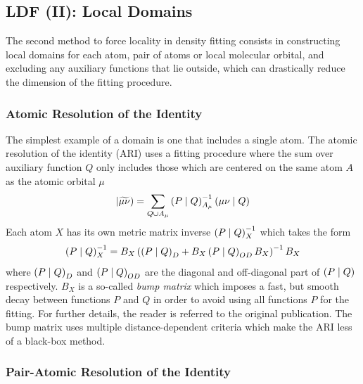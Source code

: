 
\subsection{LDF (II): Local Domains}

The second method to force locality in density fitting consists in constructing local domains for each atom, pair of atoms or local molecular orbital, and excluding any auxiliary functions that lie outside, which can drastically reduce the dimension of the fitting procedure. 

\subsubsection{Atomic Resolution of the Identity}

The simplest example of a domain is one that includes a single atom. The atomic resolution of the identity (ARI) \cite{Sod2008} uses a fitting procedure where the sum over auxiliary function $Q$ only includes those which are centered on the same atom $A$ as the atomic orbital $\mu$
\begin{equation}
\left\lvert \widetilde{\mu\nu} \right) = \sum_{Q \cup A_{\mu}} \left( P \mid Q \right)_{A_{\mu}}^{-1} \left( \mu\nu \mid Q \right)
\end{equation}
\noindent Each atom $X$ has its own metric matrix inverse $\left( P \mid Q \right)_X^{-1}$ which takes the form 
\begin{equation}
\left( P \mid Q \right)_X^{-1} = B_X \left( \left( P \mid Q \right)_D + B_X \left( P \mid Q \right)_{OD}B_X\right)^{-1}B_X
\end{equation}
\noindent where $\left( P \mid Q \right)_D$ and $\left( P \mid Q \right)_{OD}$ are the diagonal and off-diagonal part of $\left( P \mid Q \right)$ respectively. $B_X$ is a so-called \emph{bump matrix} which imposes a fast, but smooth decay between functions $P$ and $Q$ in order to avoid using all functions $P$ for the fitting. For further details, the reader is referred to the original publication. The bump matrix uses multiple distance-dependent criteria which make the ARI less of a black-box method.


\subsubsection{Pair-Atomic Resolution of the Identity}


